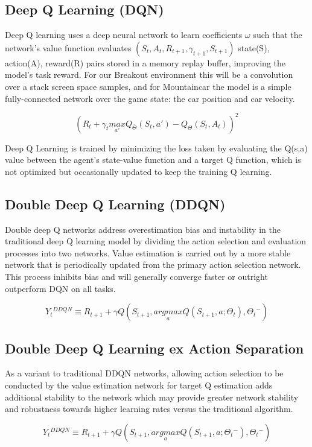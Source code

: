 \documentclass[conference]{IEEEtran}
\begin{document}
\subsection{Deep Q Learning (DQN)}
Deep Q learning uses a deep neural network to learn coefficients $\omega$ such that the network's value function evaluates $(S_{t}, A_{t}, R_{t+1},\gamma _{t+1},S_{t+1})$ state(S), action(A), reward(R) pairs stored in a memory replay buffer, improving the model's task reward. For our Breakout environment this will be a convolution over a stack screen space samples, and for Mountaincar the model is a simple fully-connected network over the game state: the car position and car velocity.

$$(R_{t} + \gamma _{t} \underset{{a}'}{max}Q_{\bar{\Theta }}(S_{t},{a}')-Q_{\Theta }(S_{t},A_{t}))^{2}$$

Deep Q Learning is trained by minimizing the loss taken by evaluating the Q(s,a) value between the agent's state-value function and a target Q function, which is not optimized but occasionally updated to keep the training Q learning.

\subsection{Double Deep Q Learning (DDQN)}
Double deep Q networks address overestimation bias and instability in the traditional deep Q learning model by dividing the action selection and evaluation processes into two networks.  Value estimation is carried out by a more stable network that is periodically updated from the primary action selection network. This process inhibits bias and will generally converge faster or outright outperform DQN on all tasks.

$$Y{_{t}}^{DDQN}\equiv R_{t+1}+\gamma Q(S_{t+1},\underset{a}{argmax}Q(S_{t+1},a;\Theta _{t}),\Theta {_{t}}^{-})$$

\subsection{Double Deep Q Learning ex Action Separation}
As a variant to traditional DDQN networks, allowing action selection to be conducted by the value estimation network for target Q estimation adds additional stability to the network which may provide greater network stability and robustness towards higher learning rates versus the traditional algorithm.

$$Y{_{t}}^{DDQN}\equiv R_{t+1}+\gamma Q(S_{t+1},\underset{a}{argmax}Q(S_{t+1},a;\Theta {_{t}}^{-}),\Theta {_{t}}^{-})$$
\end{document}
